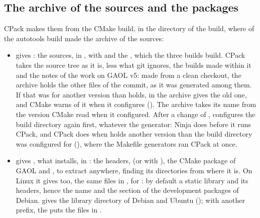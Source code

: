 \documentclass[12pt,a4paper,twoside,openright]{book}
\begin{document}
\subsection{The archive of the sources and the packages}\label{sec:packages}
%

CPack makes them from the CMake build, in the directory of the build, where
 of the autotools build made the archive of the sources:

\begin{cmdshell}
\end{cmdshell}

\begin{itemize}
\item[$\bullet$] {\sloppy \textbf{} gives
  : the sources, in
  , with  and the
  , which the three builds build. CPack takes the source
  tree as it is, less what git ignores, the builds made within it and the
  notes of the work on GAOL v5: made from a clean checkout, the archive holds
  the other files of the commit,  as it was generated among
  them. If that was for another version than  holds,
   in the archive gives the old one, and CMake warns
  of it when it configures (). The archive takes
  its name from the version CMake read when it configured. After a change of
  ,  configures the build directory
  again first, whatever the generator: Ninja does before it runs CPack, and
  CPack does when  holds another version than the build
  directory was configured for (),
  where the Makefile generators ran CPack at once.\newinvfive\par}
\item[$\bullet$] \textbf{} gives
  , what 
  installs, in : the headers,
   (or  with ),
  the CMake package of GAOL and , to extract anywhere,
   finding its directories from where it is. On Linux it gives
   too,
  the same files in , for : by default a static library
  and its headers, hence the name and the section  of the
  development packages of Debian. 
  gives the library directory of Debian and Ubuntu
  (); with another prefix, the  puts
  the files in .
\end{itemize}
\end{document}
